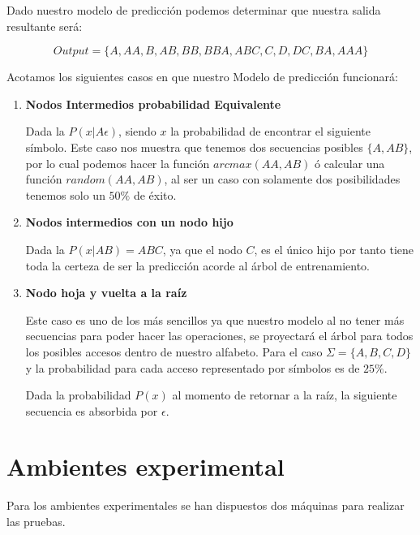 Dado nuestro modelo de predicción podemos determinar que nuestra salida resultante será:

\begin{equation}
Output = \{ A,AA,B,AB,BB,BBA,ABC,C,D,DC,BA,AAA \}
\end{equation}


Acotamos los siguientes casos en que nuestro Modelo de predicción funcionará:


\begin{enumerate}
	\item \textbf{Nodos Intermedios probabilidad Equivalente}
	
	Dada la $P( x | A\epsilon  )$, siendo $x$ la probabilidad de encontrar el siguiente símbolo. Este caso nos muestra que tenemos dos secuencias posibles $\{A,AB\}$, por lo cual podemos hacer la función $arc max(AA,AB)$ ó calcular una función $random(AA,AB)$, al ser un caso con solamente dos posibilidades tenemos solo un $50\%$ de éxito.
	
	
	\item \textbf{Nodos intermedios con un nodo hijo }
	
	Dada la $P( x | AB  )  = ABC$, ya que  el nodo $C$, es el único hijo por tanto tiene toda la certeza de ser la predicción acorde al árbol de entrenamiento.
		
		
		
	\item \textbf{Nodo hoja y vuelta a la raíz}	
	
	Este caso es uno de los más sencillos ya que nuestro modelo al no tener más secuencias para poder hacer las operaciones, se proyectará el árbol para todos los posibles accesos dentro de nuestro alfabeto. Para el caso $\Sigma = \{A,B,C,D \} $ y la probabilidad para cada acceso representado por símbolos es de $25\%$.
	
	
	Dada la probabilidad $P( x ) $ al momento de retornar a la raíz, la siguiente secuencia es absorbida por $\epsilon$.
	

\end{enumerate}







\section{Ambientes experimental}

Para los ambientes experimentales se han dispuestos dos máquinas para realizar las pruebas. 

